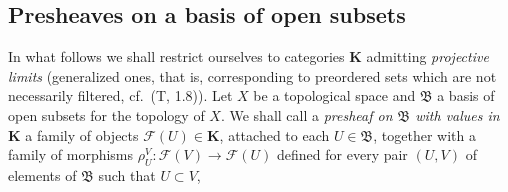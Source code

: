 \subsection{Presheaves on a basis of open subsets}
\label{subsection:0.3.2}

\begin{env}[3.2.1]
\label{0.3.2.1}
In what follows we shall restrict ourselves to categories $\mathbf{K}$
admitting \emph{projective limits} (generalized ones, that is,
corresponding to preordered sets which are not necessarily filtered,
cf.\ (T, 1.8)). Let $X$ be a topological space and $\mathfrak{B}$ a basis
of open subsets for the topology of $X$. We shall call a \emph{presheaf on
$\mathfrak{B}$ with values in $\mathbf{K}$} a family of objects
$\mathcal{F}(U)\in\mathbf{K}$, attached to each $U\in\mathfrak{B}$, together with a
family of morphisms
$\rho_U^V:\mathcal{F}(V)\to\mathcal{F}(U)$ defined for every pair $(U,V)$
of elements of $\mathfrak{B}$ such that $U\subset V$,



\end{env}
